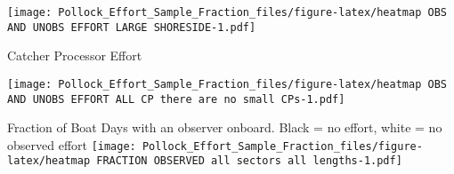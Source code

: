 \documentclass[]{article}
\begin{document}
\texttt{[image: Pollock\_Effort\_Sample\_Fraction\_files/figure-latex/heatmap OBS AND UNOBS EFFORT LARGE SHORESIDE-1.pdf]}

Catcher Processor Effort

\texttt{[image: Pollock\_Effort\_Sample\_Fraction\_files/figure-latex/heatmap OBS AND UNOBS EFFORT ALL CP there are no small CPs-1.pdf]}

Fraction of Boat Days with an observer onboard. Black = no effort, white
= no observed effort
\texttt{[image: Pollock\_Effort\_Sample\_Fraction\_files/figure-latex/heatmap FRACTION OBSERVED all sectors all lengths-1.pdf]}
\end{document}
